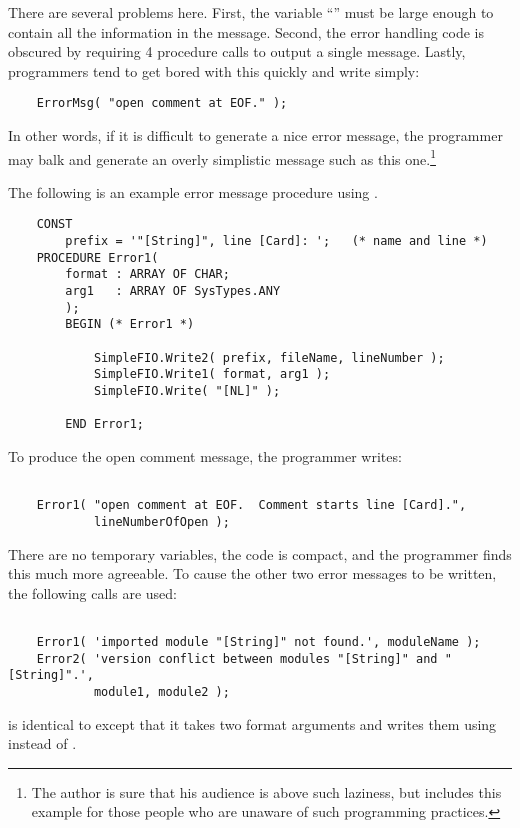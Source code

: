 There are several problems here.  First, the variable ``'' must
be large enough to contain all the information in the message.
Second, the error handling code is obscured by requiring 4
procedure calls to output a single message.  Lastly,
programmers tend to get bored with this quickly and write simply:
\begin{verbatim}
    ErrorMsg( "open comment at EOF." );
\end{verbatim}    
    
In other words, if it is difficult to generate a nice error message,
the programmer may balk and generate an overly simplistic message such
as this one.\footnote{
    The author is sure that his audience is above such laziness,
    but includes this example for those people who are unaware of
    such programming practices.}

The following is an example error message procedure using .

\begin{verbatim}
    CONST
        prefix = '"[String]", line [Card]: ';   (* name and line *)
    PROCEDURE Error1(
        format : ARRAY OF CHAR;
        arg1   : ARRAY OF SysTypes.ANY
        );
        BEGIN (* Error1 *)
            
            SimpleFIO.Write2( prefix, fileName, lineNumber );
            SimpleFIO.Write1( format, arg1 );
            SimpleFIO.Write( "[NL]" );
            
        END Error1;
\end{verbatim}
        
To produce the open comment message, the programmer
writes:
\begin{verbatim}

    Error1( "open comment at EOF.  Comment starts line [Card].", 
            lineNumberOfOpen );
\end{verbatim}    
            
There are no temporary variables, the code is compact, and
the programmer finds this much more agreeable.
To cause the other two error messages to be written, the 
following calls are used:
\begin{verbatim}

    Error1( 'imported module "[String]" not found.', moduleName );
    Error2( 'version conflict between modules "[String]" and "[String]".',
            module1, module2 );
\end{verbatim}    
 is identical to  except that it takes
two format arguments and writes them using  instead of
.

